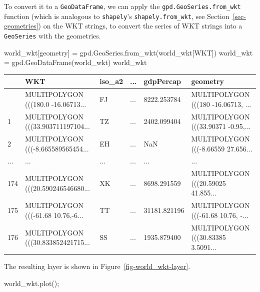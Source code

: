 \documentclass[
  letterpaper,
]{krantz}
\newenvironment{Shaded}{\begin{snugshade}}{\end{snugshade}}
\newcommand{\NormalTok}[1]{\textcolor[rgb]{0.00,0.23,0.31}{#1}}
\newcommand{\OperatorTok}[1]{\textcolor[rgb]{0.37,0.37,0.37}{#1}}
\newcommand{\StringTok}[1]{\textcolor[rgb]{0.13,0.47,0.30}{#1}}
\begin{document}
To convert it to a \texttt{GeoDataFrame}, we can apply the
\texttt{gpd.GeoSeries.from\_wkt} function (which is analogous to
\texttt{shapely}'s \texttt{shapely.from\_wkt}, see
Section~\ref{sec-geometries}) on the WKT strings, to convert the series
of WKT strings into a \texttt{GeoSeries} with the geometries.

\begin{Shaded}
\begin{Highlighting}[]
\NormalTok{world\_wkt[}\StringTok{\textquotesingle{}geometry\textquotesingle{}}\NormalTok{] }\OperatorTok{=}\NormalTok{ gpd.GeoSeries.from\_wkt(world\_wkt[}\StringTok{\textquotesingle{}WKT\textquotesingle{}}\NormalTok{])}
\NormalTok{world\_wkt }\OperatorTok{=}\NormalTok{ gpd.GeoDataFrame(world\_wkt)}
\NormalTok{world\_wkt}
\end{Highlighting}
\end{Shaded}

\begin{longtable}[]{@{}llllll@{}}
\toprule\noalign{}
& WKT & iso\_a2 & ... & gdpPercap & geometry \\
\midrule\noalign{}
\endhead
\bottomrule\noalign{}
\endlastfoot
0 & MULTIPOLYGON (((180.0 -16.06713... & FJ & ... & 8222.253784 &
MULTIPOLYGON (((180 -16.06713, ... \\
1 & MULTIPOLYGON (((33.903711197104... & TZ & ... & 2402.099404 &
MULTIPOLYGON (((33.90371 -0.95,... \\
2 & MULTIPOLYGON (((-8.665589565454... & EH & ... & NaN & MULTIPOLYGON
(((-8.66559 27.656... \\
... & ... & ... & ... & ... & ... \\
174 & MULTIPOLYGON (((20.590246546680... & XK & ... & 8698.291559 &
MULTIPOLYGON (((20.59025 41.855... \\
175 & MULTIPOLYGON (((-61.68 10.76,-6... & TT & ... & 31181.821196 &
MULTIPOLYGON (((-61.68 10.76, -... \\
176 & MULTIPOLYGON (((30.833852421715... & SS & ... & 1935.879400 &
MULTIPOLYGON (((30.83385 3.5091... \\
\end{longtable}

The resulting layer is shown in Figure~\ref{fig-world_wkt-layer}.

\begin{Shaded}
\begin{Highlighting}[]
\NormalTok{world\_wkt.plot()}\OperatorTok{;}
\end{Highlighting}
\end{Shaded}
\end{document}
